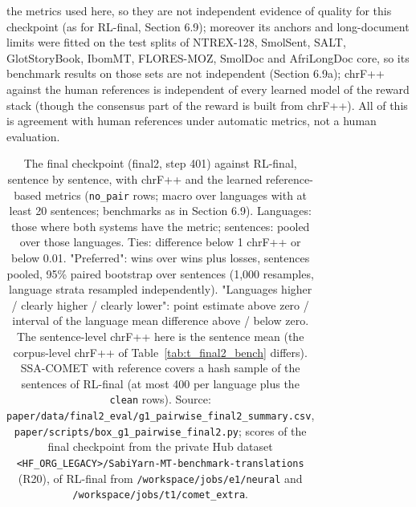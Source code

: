 the metrics used here, so they are not independent evidence of quality for this checkpoint (as for RL-final, Section 6.9); moreover its anchors and long-document limits were fitted on the test splits of NTREX-128, SmolSent, SALT, GlotStoryBook, IbomMT, FLORES-MOZ, SmolDoc and AfriLongDoc core, so its benchmark results on those sets are not independent (Section 6.9a); chrF++ against the human references is independent of every learned model of the reward stack (though the consensus part of the reward is built from chrF++). All of this is agreement with human references under automatic metrics, not a human evaluation.

\begin{table}[t]
\centering
\scriptsize
\setlength{\tabcolsep}{3pt}
\caption{The final checkpoint (final2, step 401) against RL-final, sentence by sentence, with chrF++ and the learned reference-based metrics (\texttt{no\_pair} rows; macro over languages with at least 20 sentences; benchmarks as in Section 6.9). Languages: those where both systems have the metric; sentences: pooled over those languages. Ties: difference below 1 chrF++ or below 0.01. "Preferred": wins over wins plus losses, sentences pooled, 95\% paired bootstrap over sentences (1,000 resamples, language strata resampled independently). "Languages higher / clearly higher / clearly lower": point estimate above zero / interval of the language mean difference above / below zero. The sentence-level chrF++ here is the sentence mean (the corpus-level chrF++ of Table~\ref{tab:t_final2_bench} differs). SSA-COMET with reference covers a hash sample of the sentences of RL-final (at most 400 per language plus the \texttt{clean} rows). Source: \texttt{paper/data/final2\_eval/g1\_pairwise\_final2\_summary.csv}, \texttt{paper/scripts/box\_g1\_pairwise\_final2.py}; scores of the final checkpoint from the private Hub dataset \texttt{<HF_ORG_LEGACY>/SabiYarn-MT-benchmark-translations} (R20), of RL-final from \texttt{/workspace/jobs/e1/neural} and \texttt{/workspace/jobs/t1/comet\_extra}.}
\label{tab:t_final2_pw}
{\def\LTcaptype{none} %
\begin{tabular}{@{}
  >{\raggedright\arraybackslash}p{}
  >{\raggedright\arraybackslash}p{}
  >{\raggedleft\arraybackslash}p{}
  >{\raggedleft\arraybackslash}p{}
  >{\raggedleft\arraybackslash}p{}
  >{\raggedleft\arraybackslash}p{}
}
\end{tabular}}
\end{table}
